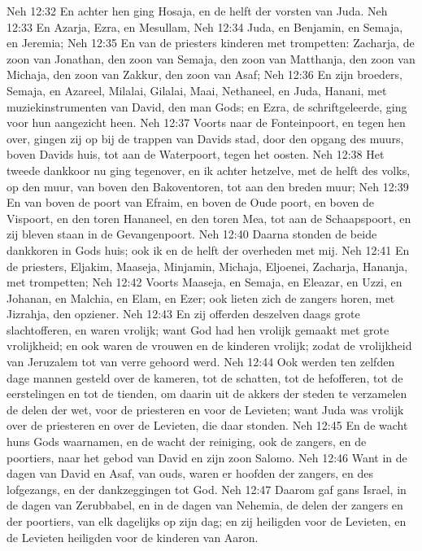 Neh 12:32  En achter hen ging Hosaja, en de helft der vorsten van Juda.
Neh 12:33  En Azarja, Ezra, en Mesullam,
Neh 12:34  Juda, en Benjamin, en Semaja, en Jeremia;
Neh 12:35  En van de priesters kinderen met trompetten: Zacharja, de zoon van Jonathan, den zoon van Semaja, den zoon van Matthanja, den zoon van Michaja, den zoon van Zakkur, den zoon van Asaf;
Neh 12:36  En zijn broeders, Semaja, en Azareel, Milalai, Gilalai, Maai, Nethaneel, en Juda, Hanani, met muziekinstrumenten van David, den man Gods; en Ezra, de schriftgeleerde, ging voor hun aangezicht heen.
Neh 12:37  Voorts naar de Fonteinpoort, en tegen hen over, gingen zij op bij de trappen van Davids stad, door den opgang des muurs, boven Davids huis, tot aan de Waterpoort, tegen het oosten.
Neh 12:38  Het tweede dankkoor nu ging tegenover, en ik achter hetzelve, met de helft des volks, op den muur, van boven den Bakoventoren, tot aan den breden muur;
Neh 12:39  En van boven de poort van Efraim, en boven de Oude poort, en boven de Vispoort, en den toren Hananeel, en den toren Mea, tot aan de Schaapspoort, en zij bleven staan in de Gevangenpoort.
Neh 12:40  Daarna stonden de beide dankkoren in Gods huis; ook ik en de helft der overheden met mij.
Neh 12:41  En de priesters, Eljakim, Maaseja, Minjamin, Michaja, Eljoenei, Zacharja, Hananja, met trompetten;
Neh 12:42  Voorts Maaseja, en Semaja, en Eleazar, en Uzzi, en Johanan, en Malchia, en Elam, en Ezer; ook lieten zich de zangers horen, met Jizrahja, den opziener.
Neh 12:43  En zij offerden deszelven daags grote slachtofferen, en waren vrolijk; want God had hen vrolijk gemaakt met grote vrolijkheid; en ook waren de vrouwen en de kinderen vrolijk; zodat de vrolijkheid van Jeruzalem tot van verre gehoord werd.
Neh 12:44  Ook werden ten zelfden dage mannen gesteld over de kameren, tot de schatten, tot de hefofferen, tot de eerstelingen en tot de tienden, om daarin uit de akkers der steden te verzamelen de delen der wet, voor de priesteren en voor de Levieten; want Juda was vrolijk over de priesteren en over de Levieten, die daar stonden.
Neh 12:45  En de wacht huns Gods waarnamen, en de wacht der reiniging, ook de zangers, en de poortiers, naar het gebod van David en zijn zoon Salomo.
Neh 12:46  Want in de dagen van David en Asaf, van ouds, waren er hoofden der zangers, en des lofgezangs, en der dankzeggingen tot God.
Neh 12:47  Daarom gaf gans Israel, in de dagen van Zerubbabel, en in de dagen van Nehemia, de delen der zangers en der poortiers, van elk dagelijks op zijn dag; en zij heiligden voor de Levieten, en de Levieten heiligden voor de kinderen van Aaron.
